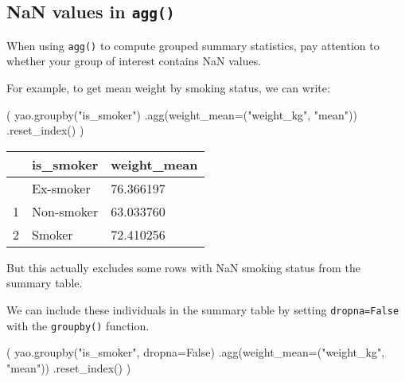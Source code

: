 \documentclass[
  letterpaper,
  DIV=11,
  numbers=noendperiod]{scrreprt}
\newenvironment{Shaded}{\begin{snugshade}}{\end{snugshade}}
\newcommand{\NormalTok}[1]{\textcolor[rgb]{0.00,0.23,0.31}{#1}}
\newcommand{\OperatorTok}[1]{\textcolor[rgb]{0.37,0.37,0.37}{#1}}
\newcommand{\StringTok}[1]{\textcolor[rgb]{0.13,0.47,0.30}{#1}}
\newcommand{\VariableTok}[1]{\textcolor[rgb]{0.07,0.07,0.07}{#1}}
\begin{document}
\begin{tcolorbox}[enhanced jigsaw, colframe=quarto-callout-warning-color-frame, opacityback=0, titlerule=0mm, bottomrule=.15mm, breakable, leftrule=.75mm, colbacktitle=quarto-callout-warning-color!10!white, title=\textcolor{quarto-callout-warning-color}{\faExclamationTriangle}\hspace{0.5em}{Watch-out}, rightrule=.15mm, coltitle=black, opacitybacktitle=0.6, colback=white, left=2mm, arc=.35mm, toptitle=1mm, bottomtitle=1mm, toprule=.15mm]

\section{\texorpdfstring{NaN values in
\texttt{agg()}}{NaN values in agg()}}\label{nan-values-in-agg}

When using \texttt{agg()} to compute grouped summary statistics, pay
attention to whether your group of interest contains NaN values.

For example, to get mean weight by smoking status, we can write:

\begin{Shaded}
\begin{Highlighting}[]
\NormalTok{(}
\NormalTok{    yao.groupby(}\StringTok{"is\_smoker"}\NormalTok{)}
\NormalTok{    .agg(weight\_mean}\OperatorTok{=}\NormalTok{(}\StringTok{"weight\_kg"}\NormalTok{, }\StringTok{"mean"}\NormalTok{))}
\NormalTok{    .reset\_index()}
\NormalTok{)}
\end{Highlighting}
\end{Shaded}

\begin{longtable}[]{@{}lll@{}}
\toprule\noalign{}
& is\_smoker & weight\_mean \\
\midrule\noalign{}
\endhead
\bottomrule\noalign{}
\endlastfoot
0 & Ex-smoker & 76.366197 \\
1 & Non-smoker & 63.033760 \\
2 & Smoker & 72.410256 \\
\end{longtable}

But this actually excludes some rows with NaN smoking status from the
summary table.

We can include these individuals in the summary table by setting
\texttt{dropna=False} with the \texttt{groupby()} function.

\begin{Shaded}
\begin{Highlighting}[]
\NormalTok{(}
\NormalTok{    yao.groupby(}\StringTok{"is\_smoker"}\NormalTok{, dropna}\OperatorTok{=}\VariableTok{False}\NormalTok{)}
\NormalTok{    .agg(weight\_mean}\OperatorTok{=}\NormalTok{(}\StringTok{"weight\_kg"}\NormalTok{, }\StringTok{"mean"}\NormalTok{))}
\NormalTok{    .reset\_index()}
\NormalTok{)}
\end{Highlighting}
\end{Shaded}


\end{tcolorbox}
\end{document}
